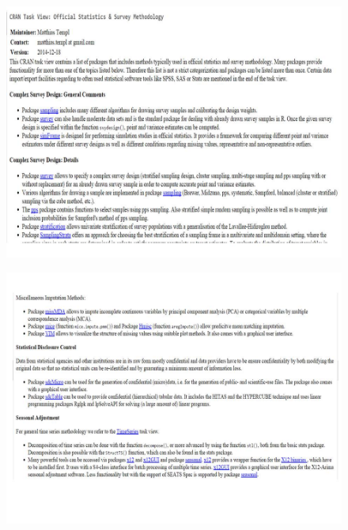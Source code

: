 \documentclass{beamer}
\begin{document}
\begin{frame}
	\begin{figure}
		\centering
		\includegraphics[width=1.1\linewidth]{./JPEGS/Slide1}
	\end{figure}
\end{frame}
\begin{frame}
	\begin{figure}
		\centering
		\includegraphics[width=1.1\linewidth]{./JPEGS/Slide2}
	\end{figure}
\end{frame}
\end{document}
